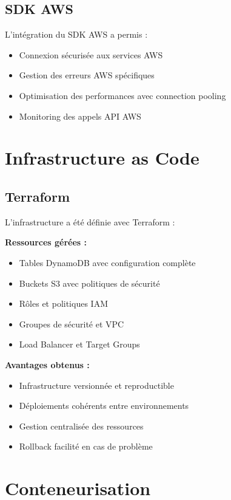 \subsection{SDK AWS}

L'intégration du SDK AWS a permis :
\begin{itemize}
    \item Connexion sécurisée aux services AWS
    \item Gestion des erreurs AWS spécifiques
    \item Optimisation des performances avec connection pooling
    \item Monitoring des appels API AWS
\end{itemize}

\section{Infrastructure as Code}

\subsection{Terraform}

L'infrastructure a été définie avec Terraform :

\textbf{Ressources gérées :}
\begin{itemize}
    \item Tables DynamoDB avec configuration complète
    \item Buckets S3 avec politiques de sécurité
    \item Rôles et politiques IAM
    \item Groupes de sécurité et VPC
    \item Load Balancer et Target Groups
\end{itemize}

\textbf{Avantages obtenus :}
\begin{itemize}
    \item Infrastructure versionnée et reproductible
    \item Déploiements cohérents entre environnements
    \item Gestion centralisée des ressources
    \item Rollback facilité en cas de problème
\end{itemize}

\section{Conteneurisation}

